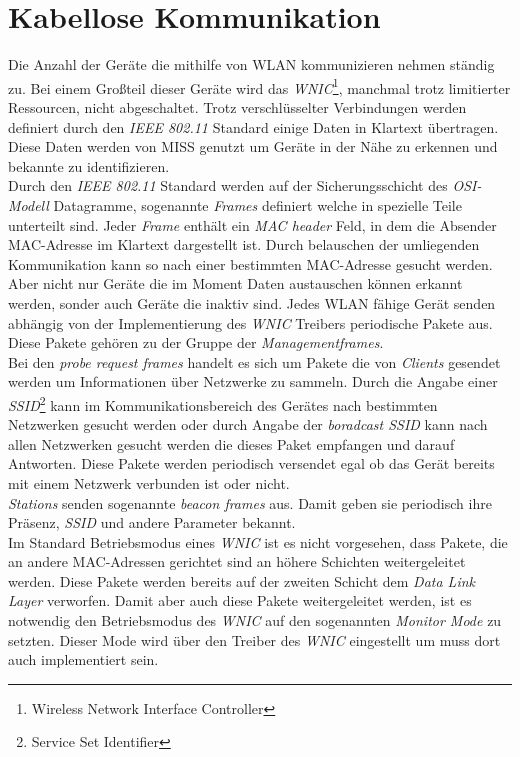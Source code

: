 \documentclass[]{report}
\begin{document}
\section{Kabellose Kommunikation}
Die Anzahl der Geräte die mithilfe von WLAN kommunizieren nehmen ständig zu. Bei einem Großteil dieser Geräte wird das \textit{WNIC}\footnote{Wireless Network Interface Controller}, manchmal trotz limitierter Ressourcen, nicht abgeschaltet. Trotz verschlüsselter Verbindungen werden definiert durch den \textit{IEEE 802.11} Standard einige Daten in Klartext übertragen. Diese Daten werden von MISS genutzt um Geräte in der Nähe zu erkennen und bekannte zu identifizieren. \\
Durch den \textit{IEEE 802.11} Standard werden auf der Sicherungsschicht des \textit{OSI-Modell} Datagramme, sogenannte \textit{Frames} definiert welche in spezielle Teile unterteilt sind. Jeder \textit{Frame} enthält ein \textit{MAC header} Feld, in dem die Absender MAC-Adresse im Klartext dargestellt ist. Durch belauschen der umliegenden Kommunikation kann so nach einer bestimmten MAC-Adresse gesucht werden. \\
Aber nicht nur Geräte die im Moment Daten austauschen können erkannt werden, sonder auch Geräte die inaktiv sind. Jedes WLAN fähige Gerät senden abhängig von der Implementierung des \textit{WNIC} Treibers periodische Pakete aus. Diese Pakete gehören zu der Gruppe der \textit{Managementframes}. \\
Bei den \textit{probe request frames} handelt es sich um Pakete die von \textit{Clients} gesendet werden um Informationen über Netzwerke zu sammeln. Durch die Angabe einer \textit{SSID}\footnote{Service Set Identifier} kann im Kommunikationsbereich des Gerätes nach bestimmten Netzwerken gesucht werden oder durch Angabe der \textit{boradcast SSID} kann nach allen Netzwerken gesucht werden die dieses Paket empfangen und darauf Antworten. Diese Pakete werden periodisch versendet egal ob das Gerät bereits mit einem Netzwerk verbunden ist oder nicht.\\
\textit{Stations} senden sogenannte \textit{beacon frames} aus. Damit geben sie periodisch ihre Präsenz, \textit{SSID} und andere Parameter bekannt. \\
Im Standard Betriebsmodus eines \textit{WNIC} ist es nicht vorgesehen, dass Pakete, die an andere MAC-Adressen gerichtet sind an höhere Schichten weitergeleitet werden. Diese Pakete werden bereits auf der zweiten Schicht dem \textit{Data Link Layer} verworfen. Damit aber auch diese Pakete weitergeleitet werden, ist es notwendig den Betriebsmodus des \textit{WNIC} auf den sogenannten \textit{Monitor Mode} zu setzten. Dieser Mode wird über den Treiber des \textit{WNIC} eingestellt um muss dort auch implementiert sein. 
\end{document}
